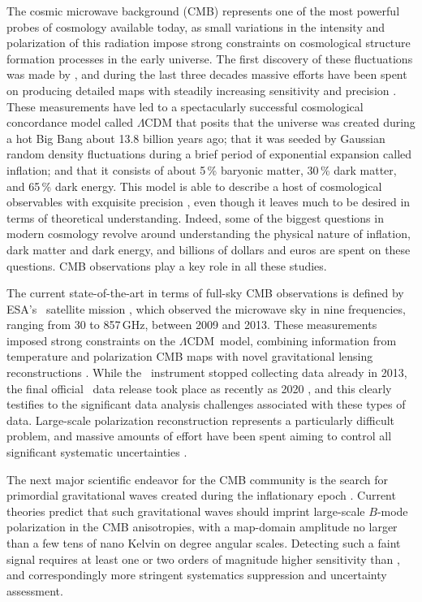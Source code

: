 \documentclass[twocolumn]{aa}
\def\LCDM{$\Lambda$CDM}
\begin{document}
The cosmic microwave background (CMB) represents one of the most
powerful probes of cosmology available today, as small variations in
the intensity and polarization of this radiation impose strong
constraints on cosmological structure formation processes in the early
universe. The first discovery of these fluctuations was made by
\citet{smoot:1992}, and during the last three decades massive efforts
have been spent on producing detailed maps with steadily increasing
sensitivity and precision \citep[e.g.,][and references
  therein]{bennett2012,debernardis:2000,Louis:2017,Sievers:2013,ogburn:2010,
  planck2016-l01}. These measurements have led to a spectacularly
successful cosmological concordance model called $\Lambda$CDM that
posits that the universe was created during a hot Big Bang about 13.8
billion years ago; that it was seeded by Gaussian random density
fluctuations during a brief period of exponential expansion called
inflation; and that it consists of about 5\,\% baryonic matter, 30\,\%
dark matter, and 65\,\% dark energy. This model is able to describe a
host of cosmological observables with exquisite precision \citep[see
  e.g.][]{planck2016-l06}, even though it leaves much to be desired in
terms of theoretical understanding. Indeed, some of the biggest
questions in modern cosmology revolve around understanding the
physical nature of inflation, dark matter and dark energy, and
billions of dollars and euros are spent on these questions. CMB
observations play a key role in all these studies.

The current state-of-the-art in terms of full-sky CMB observations is
defined by ESA's \Planck\ satellite mission
\citep{planck2013-p01,planck2014-a01,planck2016-l01}, which observed
the microwave sky in nine frequencies, ranging from 30 to 857\,GHz,
between 2009 and 2013. These measurements imposed strong constraints
on the \LCDM\ model, combining information from temperature and
polarization CMB maps with novel gravitational lensing reconstructions
\citep{planck2016-l06}. While the \Planck\ instrument stopped
collecting data already in 2013, the final official \Planck\ data
release took place as recently as 2020 \citep{npipe}, and this
clearly testifies to the significant data analysis challenges
associated with these types of data. Large-scale polarization
reconstruction represents a particularly difficult problem, and
massive amounts of effort have been spent aiming to control all
significant systematic uncertainties
\citep[e.g.,][]{npipe,delouis:2019}.

The next major scientific endeavor for the CMB community is the
search for primordial gravitational waves created during the
inflationary epoch \citep[e.g.,][]{kamionkowski:2016}. Current theories predict that such gravitational
waves should imprint large-scale $B$-mode polarization in the CMB
anisotropies, with a map-domain amplitude no larger than a few tens of
nano Kelvin on degree angular scales. Detecting such a faint signal
requires at least one or two orders of magnitude higher sensitivity
than \Planck, and correspondingly more stringent systematics
suppression and uncertainty assessment.
\end{document}
